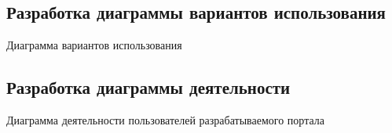 \subsection{Разработка диаграммы вариантов использования}
Диаграмма вариантов использования 

\subsection{Разработка диаграммы деятельности}
Диаграмма деятельности пользователей разрабатываемого портала

\clearpage
